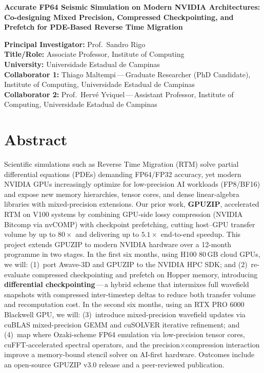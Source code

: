 \documentclass[11pt,a4paper]{article}
\newcommand{\gpuzip}{GPUZIP}
\begin{document}
\begin{center}
{\Large\bfseries Accurate FP64 Seismic Simulation on Modern NVIDIA
Architectures: Co-designing Mixed Precision, Compressed Checkpointing, and
Prefetch for PDE-Based Reverse Time Migration}
\end{center}

\vspace{1em}

\noindent\textbf{Principal Investigator:} Prof.\ Sandro Rigo\\
\textbf{Title/Role:} Associate Professor, Institute of Computing\\
\textbf{University:} Universidade Estadual de Campinas\\
\textbf{Collaborator 1:} Thiago Maltempi\,---\,Graduate Researcher (PhD
Candidate), Institute of Computing, Universidade Estadual de Campinas\\
\textbf{Collaborator 2:} Prof.\ Hervé Yviquel\,---\,Assistant Professor,
Institute of Computing, Universidade Estadual de Campinas

\section*{Abstract}

Scientific simulations such as Reverse Time Migration (RTM) solve partial
differential equations (PDEs) demanding FP64/FP32 accuracy, yet modern NVIDIA
GPUs increasingly optimize for low-precision AI workloads (FP8/BF16) and expose
new memory hierarchies, tensor cores, and dense linear-algebra libraries with
mixed-precision extensions. Our prior work, \textbf{\gpuzip}, accelerated RTM on
V100 systems by combining GPU-side lossy compression (NVIDIA Bitcomp via nvCOMP)
with checkpoint prefetching, cutting host--GPU transfer volume by up to
$80\times$ and delivering up to $5.1\times$ end-to-end speedup. This project
extends \gpuzip{} to modern NVIDIA hardware over a 12-month programme in two
stages. In the first six months, using H100 80\,GB cloud GPUs, we will:
(1)~port Awave-3D and \gpuzip{} to the NVIDIA HPC SDK; and (2)~re-evaluate
compressed checkpointing and prefetch on Hopper memory, introducing
\textbf{differential checkpointing}\,---\,a hybrid scheme that intermixes full
wavefield snapshots with compressed inter-timestep deltas to reduce both
transfer volume and recomputation cost. In the second six months, using an RTX
PRO 6000 Blackwell GPU, we will: (3)~introduce mixed-precision wavefield updates
via cuBLAS mixed-precision GEMM and cuSOLVER iterative refinement; and (4)~map
where Ozaki-scheme FP64 emulation via low-precision tensor cores,
cuFFT-accelerated spectral operators, and the precision$\times$compression
interaction improve a memory-bound stencil solver on AI-first hardware.
Outcomes include an open-source \gpuzip{} v3.0 release and a peer-reviewed
publication.
\end{document}
